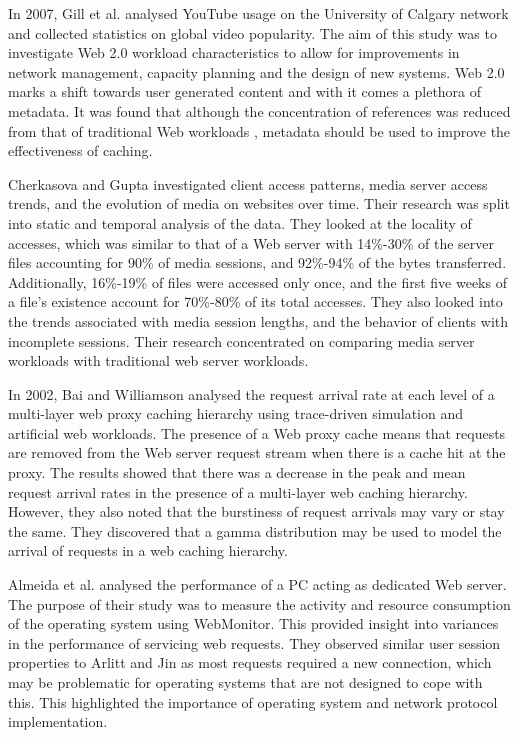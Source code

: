 \documentclass[10pt,conference]{IEEEtran}
\begin{document}
In 2007, Gill et al. \cite{youtube} analysed YouTube usage on the University of Calgary network and collected statistics on global video popularity. The aim of this study was to investigate Web 2.0 workload characteristics to allow for improvements in network management, capacity planning and the design of new systems. Web 2.0 marks a shift towards user generated content and with it comes a plethora of metadata. It was found that although the concentration of references was reduced from that of traditional Web workloads \cite{keynote}, metadata should be used to improve the effectiveness of caching.

Cherkasova and Gupta \cite{Cherkasova} investigated client access patterns, media server access trends, and the evolution of media on websites over time. Their research was split into static and temporal analysis of the data. They looked at the locality of accesses, which was similar to that of a Web server with 14\%-30\% of the server files accounting for 90\% of media sessions, and 92\%-94\% of the bytes transferred. Additionally, 16\%-19\% of files were accessed only once, and the first five weeks of a file’s existence account for 70\%-80\% of its total accesses. They also looked into the trends associated with media session lengths, and the behavior of clients with incomplete sessions. Their research concentrated on comparing media server workloads with traditional web server workloads.

In 2002, Bai and Williamson \cite{Bai} analysed the request arrival rate at each level of a multi-layer web proxy caching hierarchy using trace-driven simulation and artificial web workloads. The presence of a Web proxy cache means that requests are removed from the Web server request stream when there is a cache hit at the proxy. The results showed that there was a decrease in the peak and mean request arrival rates in the presence of a multi-layer web caching hierarchy. However, they also noted that the burstiness of request arrivals may vary or stay the same. They discovered that a gamma distribution may be used to model the arrival of requests in a web caching hierarchy.

Almeida et al. \cite{almeida} analysed the performance of a PC acting as dedicated Web server. The purpose of their study was to measure the activity and resource consumption of the operating system using WebMonitor. This provided insight into variances in the performance of servicing web requests. They observed similar user session properties to Arlitt and Jin \cite{world_cup} as most requests required a new connection, which may be problematic for operating systems that are not designed to cope with this. This highlighted the importance of operating system and network protocol implementation.
\end{document}
